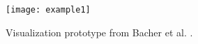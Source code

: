 \begin{figure}[ht]
  \texttt{[image: example1]}
  \caption[Visualization example]{Visualization prototype from Bacher et al. \cite{bacher_using_2016}.}
  \label{fig:example1}
  \centering
\end{figure}